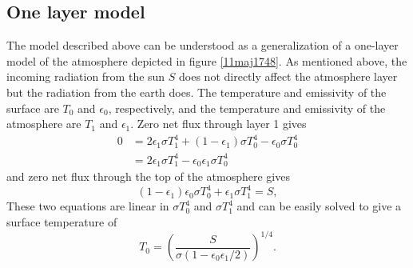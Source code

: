 \documentclass[twocolumn]{article}
\begin{document}
\begin{large}
\subsection*{One layer model}
The model described above can be understood as a generalization of a one-layer model of the atmosphere depicted in figure \ref{11maj1748}. As mentioned above, the incoming radiation from the sun $S$ does not directly affect the atmosphere layer but the radiation from the earth does. The temperature and emissivity of the surface are $T_0$ and $\epsilon_0$, respectively, and the temperature and emissivity of the atmosphere are $T_1$ and $\epsilon_1$. Zero net flux through layer 1 gives 
\begin{equation}
    \label{11maj2007}
    \begin{split}
        0 &= 2\epsilon_1\sigma T_1^4 + (1-\epsilon_1)\sigma T_0^4 - \epsilon_0\sigma T_0^4 \\ 
        &= 2\epsilon_1\sigma T_1^4 - \epsilon_0\epsilon_1\sigma T_0^4
    \end{split}
\end{equation}
and zero net flux through the top of the atmosphere gives 
\begin{equation}
    (1-\epsilon_1)\epsilon_0\sigma T_0^4 + \epsilon_1\sigma T_1^4 = S,
\end{equation}
These two equations are linear in $\sigma T_0^4$ and $\sigma T_1^4$ and can be easily solved to give a surface temperature of 
\begin{equation}
    \label{11maj2008}
    T_0 = \left(\frac{S}{\sigma(1-\epsilon_0\epsilon_1/2)}\right)^{1/4}.
\end{equation}


\end{large}
\end{document}
